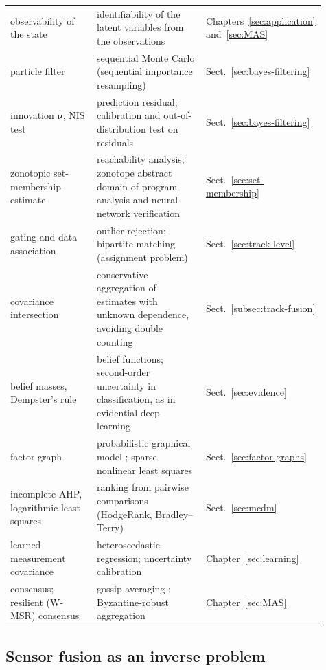 \documentclass[graybox,envcountchap]{style/SNmono}
\begin{document}
\begin{table}[!t]
\begin{tabular}{>{\raggedright\arraybackslash}p{0.33\linewidth} >{\raggedright\arraybackslash}p{0.44\linewidth} >{\raggedright\arraybackslash}p{0.14\linewidth}}
       observability of the state & identifiability of the latent variables from the observations & Chapters~\ref{sec:application} and~\ref{sec:MAS} \\
        particle filter & sequential Monte Carlo (sequential importance resampling) & Sect.~\ref{sec:bayes-filtering} \\
        innovation $\boldsymbol{\nu}$, NIS test & prediction residual; calibration and out-of-distribution test on residuals & Sect.~\ref{sec:bayes-filtering} \\
        zonotopic set-membership estimate & reachability analysis; zonotope abstract domain of program analysis and neural-network verification & Sect.~\ref{sec:set-membership} \\
        gating and data association & outlier rejection; bipartite matching (assignment problem) & Sect.~\ref{sec:track-level} \\
        covariance intersection & conservative aggregation of estimates with unknown dependence, avoiding double counting & Sect.~\ref{subsec:track-fusion} \\
        belief masses, Dempster's rule & belief functions; second-order uncertainty in classification, as in evidential deep learning \cite{sensoy2018_edl} & Sect.~\ref{sec:evidence} \\
        factor graph & probabilistic graphical model \cite{kschischang2001_factor}; sparse nonlinear least squares & Sect.~\ref{sec:factor-graphs} \\
        incomplete AHP, logarithmic least squares & ranking from pairwise comparisons (HodgeRank, Bradley--Terry) & Sect.~\ref{sec:mcdm} \\
        learned measurement covariance & heteroscedastic regression; uncertainty calibration & Chapter~\ref{sec:learning} \\
        consensus; resilient (W-MSR) consensus & gossip averaging \cite{boyd2006_gossip}; Byzantine-robust aggregation & Chapter~\ref{sec:MAS} \\
        \hline
    \end{tabular}
\end{table}







\subsection{Sensor fusion as an inverse problem}
\end{document}
